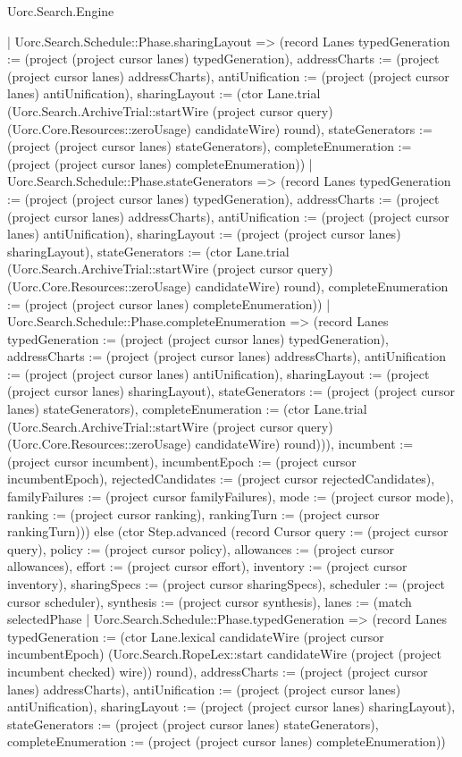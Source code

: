 \begin{lexlean}{Uorc.Search.Engine}
\begin{semanticmodule}
{{            | Uorc.Search.Schedule::Phase.sharingLayout => (record Lanes {typedGeneration := (project (project cursor lanes) typedGeneration), addressCharts := (project (project cursor lanes) addressCharts), antiUnification := (project (project cursor lanes) antiUnification), sharingLayout := (ctor Lane.trial (Uorc.Search.ArchiveTrial::startWire (project cursor query) (Uorc.Core.Resources::zeroUsage) candidateWire) round), stateGenerators := (project (project cursor lanes) stateGenerators), completeEnumeration := (project (project cursor lanes) completeEnumeration)})
            | Uorc.Search.Schedule::Phase.stateGenerators => (record Lanes {typedGeneration := (project (project cursor lanes) typedGeneration), addressCharts := (project (project cursor lanes) addressCharts), antiUnification := (project (project cursor lanes) antiUnification), sharingLayout := (project (project cursor lanes) sharingLayout), stateGenerators := (ctor Lane.trial (Uorc.Search.ArchiveTrial::startWire (project cursor query) (Uorc.Core.Resources::zeroUsage) candidateWire) round), completeEnumeration := (project (project cursor lanes) completeEnumeration)})
            | Uorc.Search.Schedule::Phase.completeEnumeration => (record Lanes {typedGeneration := (project (project cursor lanes) typedGeneration), addressCharts := (project (project cursor lanes) addressCharts), antiUnification := (project (project cursor lanes) antiUnification), sharingLayout := (project (project cursor lanes) sharingLayout), stateGenerators := (project (project cursor lanes) stateGenerators), completeEnumeration := (ctor Lane.trial (Uorc.Search.ArchiveTrial::startWire (project cursor query) (Uorc.Core.Resources::zeroUsage) candidateWire) round)})), incumbent := (project cursor incumbent), incumbentEpoch := (project cursor incumbentEpoch), rejectedCandidates := (project cursor rejectedCandidates), familyFailures := (project cursor familyFailures), mode := (project cursor mode), ranking := (project cursor ranking), rankingTurn := (project cursor rankingTurn)})) else (ctor Step.advanced (record Cursor {query := (project cursor query), policy := (project cursor policy), allowances := (project cursor allowances), effort := (project cursor effort), inventory := (project cursor inventory), sharingSpecs := (project cursor sharingSpecs), scheduler := (project cursor scheduler), synthesis := (project cursor synthesis), lanes := (match selectedPhase
            | Uorc.Search.Schedule::Phase.typedGeneration => (record Lanes {typedGeneration := (ctor Lane.lexical candidateWire (project cursor incumbentEpoch) (Uorc.Search.RopeLex::start candidateWire (project (project incumbent checked) wire)) round), addressCharts := (project (project cursor lanes) addressCharts), antiUnification := (project (project cursor lanes) antiUnification), sharingLayout := (project (project cursor lanes) sharingLayout), stateGenerators := (project (project cursor lanes) stateGenerators), completeEnumeration := (project (project cursor lanes) completeEnumeration)})
}}
\end{semanticmodule}
\end{lexlean}
